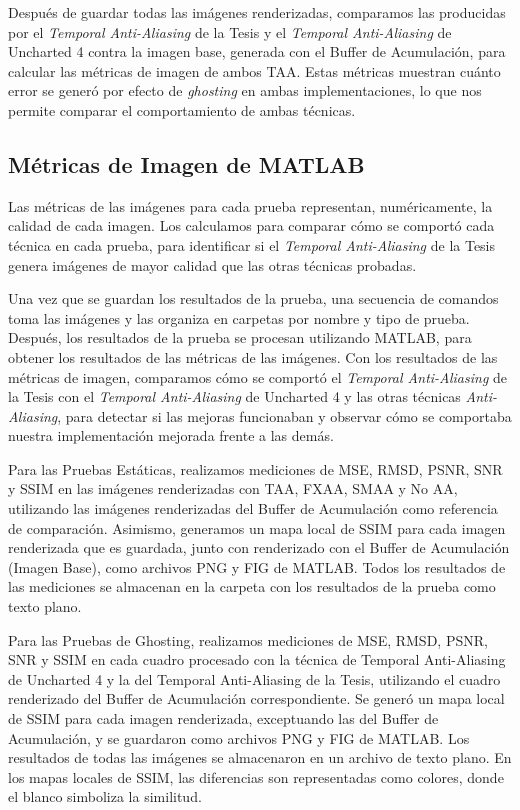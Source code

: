 \documentclass[pregrado]{tesis-usb} %
\begin{document}
Después de guardar todas las imágenes renderizadas, comparamos las producidas por el \textit{Temporal Anti-Aliasing} de la Tesis y el \textit{Temporal Anti-Aliasing} de Uncharted 4 contra la imagen base, generada con el Buffer de Acumulación, para calcular las métricas de imagen de ambos TAA. Estas métricas muestran cuánto error se generó por efecto de \textit{ghosting} en ambas implementaciones, lo que nos permite comparar el comportamiento de ambas técnicas. 


\subsection{Métricas de Imagen de MATLAB}
Las métricas de las imágenes para cada prueba representan, numéricamente, la calidad de cada imagen. Los calculamos para comparar cómo se comportó cada técnica en cada prueba, para identificar si el \textit{Temporal Anti-Aliasing} de la Tesis genera imágenes de mayor calidad que las otras técnicas probadas.

Una vez que se guardan los resultados de la prueba, una secuencia de comandos toma las imágenes y las organiza en carpetas por nombre y tipo de prueba. Después, los resultados de la prueba se procesan utilizando MATLAB, para obtener los resultados de las métricas de las imágenes. Con los resultados de las métricas de imagen, comparamos cómo se comportó el \textit{Temporal Anti-Aliasing} de la Tesis con el \textit{Temporal Anti-Aliasing} de Uncharted 4 y las otras técnicas \textit{Anti-Aliasing}, para detectar si las mejoras funcionaban y observar cómo se comportaba nuestra implementación mejorada frente a las demás.

Para las Pruebas Estáticas, realizamos mediciones de MSE, RMSD, PSNR, SNR y SSIM en las imágenes renderizadas con TAA, FXAA, SMAA y No AA, utilizando las imágenes renderizadas del Buffer de Acumulación como referencia de comparación. Asimismo, generamos un mapa local de SSIM para cada imagen renderizada que es guardada, junto con renderizado con el Buffer de Acumulación (Imagen Base), como archivos PNG y FIG de MATLAB. Todos los resultados de las mediciones se almacenan en la carpeta con los resultados de la prueba como texto plano.

Para las Pruebas de Ghosting, realizamos mediciones de MSE, RMSD, PSNR, SNR y SSIM en cada cuadro procesado con la técnica de Temporal Anti-Aliasing de Uncharted 4 y la del Temporal Anti-Aliasing de la Tesis, utilizando el cuadro renderizado del Buffer de Acumulación correspondiente. Se generó un mapa local de SSIM para cada imagen renderizada, exceptuando las del Buffer de Acumulación, y se guardaron como  archivos  PNG y FIG de MATLAB. Los resultados de todas las imágenes se almacenaron en un archivo de texto plano. En los mapas locales de SSIM, las diferencias son representadas como colores, donde el blanco simboliza la similitud.
\end{document}
